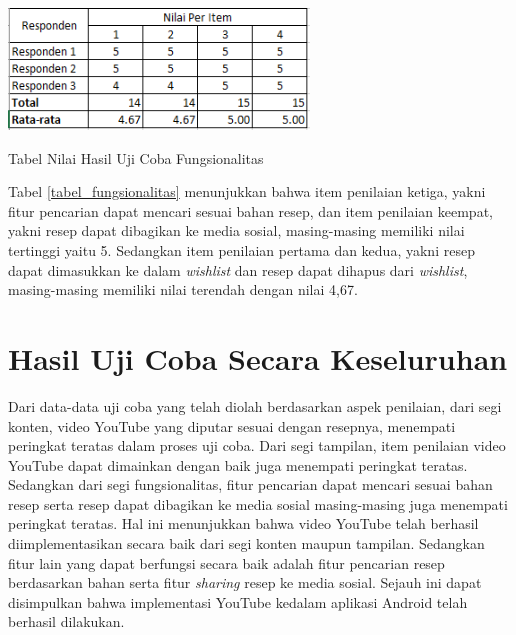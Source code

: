 			\begin{table}[H]
				\centering
				\includegraphics[width=0.6\textwidth]{gambar/new/fungsi_tabel}
				\caption{Tabel Nilai Hasil Uji Coba Fungsionalitas}
				\label{tabel_fungsionalitas}
			\end{table}
			Tabel \ref{tabel_fungsionalitas} menunjukkan bahwa item penilaian ketiga, yakni fitur pencarian dapat mencari sesuai bahan resep, dan item penilaian keempat, yakni resep dapat dibagikan ke media sosial, masing-masing memiliki nilai tertinggi yaitu 5. Sedangkan item penilaian pertama dan kedua, yakni resep dapat dimasukkan ke dalam \textit{wishlist} dan resep dapat dihapus dari \textit{wishlist}, masing-masing memiliki nilai terendah dengan nilai 4,67.			
	
	\section{Hasil Uji Coba Secara Keseluruhan}
		Dari data-data uji coba yang telah diolah berdasarkan aspek penilaian, dari segi konten, video YouTube yang diputar sesuai dengan resepnya, menempati peringkat teratas dalam proses uji coba. Dari segi tampilan, item penilaian video YouTube dapat dimainkan dengan baik juga menempati peringkat teratas. Sedangkan dari segi fungsionalitas, fitur pencarian dapat mencari sesuai bahan resep serta resep dapat dibagikan ke media sosial masing-masing juga menempati peringkat teratas. Hal ini menunjukkan bahwa video YouTube telah berhasil diimplementasikan secara baik dari segi konten maupun tampilan. Sedangkan fitur lain yang dapat berfungsi secara baik adalah fitur pencarian resep berdasarkan bahan serta fitur \textit{sharing} resep ke media sosial. Sejauh ini dapat disimpulkan bahwa implementasi YouTube kedalam aplikasi Android telah berhasil dilakukan.
		
